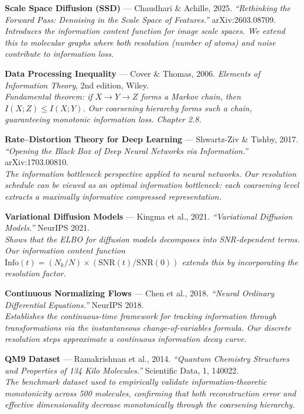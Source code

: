\documentclass[12pt,a4paper]{article}
\begin{document}
\begin{enumerate}[leftmargin=*, label={[\arabic*]}]

\item \textbf{Scale Space Diffusion (SSD)} --- Chaudhari \& Achille, 2025.
\textit{``Rethinking the Forward Pass: Denoising in the Scale Space of Features.''}
arXiv:2603.08709.\\
\emph{Introduces the information content function for image scale spaces. We extend this to molecular graphs where both resolution (number of atoms) and noise contribute to information loss.}

\item \textbf{Data Processing Inequality} --- Cover \& Thomas, 2006.
\textit{Elements of Information Theory}, 2nd edition, Wiley.\\
\emph{Fundamental theorem: if $X \to Y \to Z$ forms a Markov chain, then $I(X;Z) \leq I(X;Y)$. Our coarsening hierarchy forms such a chain, guaranteeing monotonic information loss. Chapter 2.8.}

\item \textbf{Rate--Distortion Theory for Deep Learning} --- Shwartz-Ziv \& Tishby, 2017.
\textit{``Opening the Black Box of Deep Neural Networks via Information.''}
arXiv:1703.00810.\\
\emph{The information bottleneck perspective applied to neural networks. Our resolution schedule can be viewed as an optimal information bottleneck: each coarsening level extracts a maximally informative compressed representation.}

\item \textbf{Variational Diffusion Models} --- Kingma et al., 2021.
\textit{``Variational Diffusion Models.''}
NeurIPS 2021.\\
\emph{Shows that the ELBO for diffusion models decomposes into SNR-dependent terms. Our information content function $\text{Info}(t) = (N_k/N) \times (\text{SNR}(t)/\text{SNR}(0))$ extends this by incorporating the resolution factor.}

\item \textbf{Continuous Normalizing Flows} --- Chen et al., 2018.
\textit{``Neural Ordinary Differential Equations.''}
NeurIPS 2018.\\
\emph{Establishes the continuous-time framework for tracking information through transformations via the instantaneous change-of-variables formula. Our discrete resolution steps approximate a continuous information decay curve.}

\item \textbf{QM9 Dataset} --- Ramakrishnan et al., 2014.
\textit{``Quantum Chemistry Structures and Properties of 134 Kilo Molecules.''}
Scientific Data, 1, 140022.\\
\emph{The benchmark dataset used to empirically validate information-theoretic monotonicity across 500 molecules, confirming that both reconstruction error and effective dimensionality decrease monotonically through the coarsening hierarchy.}

\end{enumerate}
\end{document}

